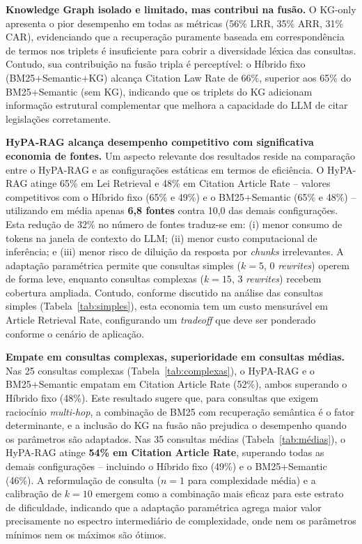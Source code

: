 \documentclass[12pt]{article}
\begin{document}
\textbf{Knowledge Graph isolado e limitado, mas contribui na fusão.} O KG-only apresenta o pior desempenho em todas as métricas (56\% LRR, 35\% ARR, 31\% CAR), evidenciando que a recuperação puramente baseada em correspondência de termos nos triplets é insuficiente para cobrir a diversidade léxica das consultas. Contudo, sua contribuição na fusão tripla é perceptível: o Híbrido fixo (BM25+Semantic+KG) alcança Citation Law Rate de 66\%, superior aos 65\% do BM25+Semantic (sem KG), indicando que os triplets do KG adicionam informação estrutural complementar que melhora a capacidade do LLM de citar legislações corretamente.

\textbf{HyPA-RAG alcança desempenho competitivo com significativa economia de fontes.} Um aspecto relevante dos resultados reside na comparação entre o HyPA-RAG e as configurações estáticas em termos de eficiência. O HyPA-RAG atinge 65\% em Lei Retrieval e 48\% em Citation Article Rate -- valores competitivos com o Híbrido fixo (65\% e 49\%) e o BM25+Semantic (65\% e 48\%) -- utilizando em média apenas \textbf{6,8 fontes} contra 10,0 das demais configurações. Esta redução de 32\% no número de fontes traduz-se em: (i) menor consumo de tokens na janela de contexto do LLM; (ii) menor custo computacional de inferência; e (iii) menor risco de diluição da resposta por \textit{chunks} irrelevantes. A adaptação paramétrica permite que consultas simples ($k = 5$, 0 \textit{rewrites}) operem de forma leve, enquanto consultas complexas ($k = 15$, 3 \textit{rewrites}) recebem cobertura ampliada. Contudo, conforme discutido na análise das consultas simples (Tabela~\ref{tab:simples}), esta economia tem um custo mensurável em Article Retrieval Rate, configurando um \textit{tradeoff} que deve ser ponderado conforme o cenário de aplicação.

\textbf{Empate em consultas complexas, superioridade em consultas médias.} Nas 25 consultas complexas (Tabela~\ref{tab:complexas}), o HyPA-RAG e o BM25+Semantic empatam em Citation Article Rate (52\%), ambos superando o Híbrido fixo (48\%). Este resultado sugere que, para consultas que exigem raciocínio \textit{multi-hop}, a combinação de BM25 com recuperação semântica é o fator determinante, e a inclusão do KG na fusão não prejudica o desempenho quando os parâmetros são adaptados. Nas 35 consultas médias (Tabela~\ref{tab:médias}), o HyPA-RAG atinge \textbf{54\% em Citation Article Rate}, superando todas as demais configurações -- incluindo o Híbrido fixo (49\%) e o BM25+Semantic (46\%). A reformulação de consulta ($n = 1$ para complexidade média) e a calibração de $k = 10$ emergem como a combinação mais eficaz para este estrato de dificuldade, indicando que a adaptação paramétrica agrega maior valor precisamente no espectro intermediário de complexidade, onde nem os parâmetros mínimos nem os máximos são ótimos.
\end{document}
